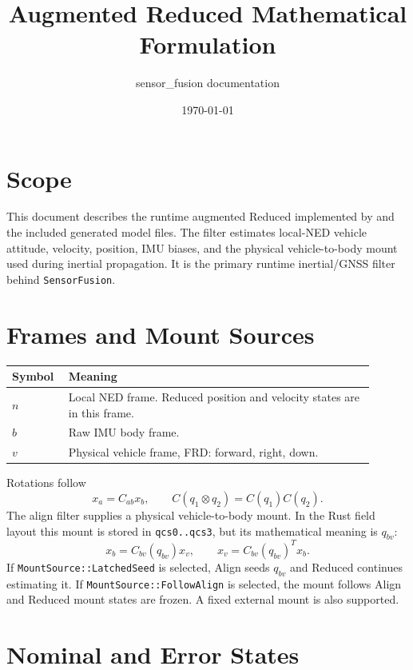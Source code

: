 \documentclass[11pt]{article}
\title{Augmented Reduced Mathematical Formulation}
\author{sensor\_fusion documentation}
\date{\today}
\newcommand{\T}{^{T}}
\begin{document}
\maketitle
\tableofcontents
\newpage

\section{Scope}

This document describes the runtime augmented Reduced implemented by
 and the included generated model files. The
filter estimates local-NED vehicle attitude, velocity, position, IMU biases, and
the physical vehicle-to-body mount used during inertial propagation.
It is the primary runtime inertial/GNSS filter behind \texttt{SensorFusion}.

\section{Frames and Mount Sources}

\begin{longtable}{>{\raggedright\arraybackslash}p{0.12\linewidth} >{\raggedright\arraybackslash}p{0.78\linewidth}}
\toprule
\textbf{Symbol} & \textbf{Meaning} \\
\midrule
\(n\) & Local NED frame. Reduced position and velocity states are in this frame. \\
\(b\) & Raw IMU body frame. \\
\(v\) & Physical vehicle frame, FRD: forward, right, down. \\
\bottomrule
\end{longtable}

Rotations follow
\begin{equation}
  x_a=C_{ab}x_b,\qquad C(q_1\otimes q_2)=C(q_1)C(q_2).
\end{equation}
The align filter supplies a physical vehicle-to-body mount. In the Rust field
layout this mount is stored in \texttt{qcs0..qcs3}, but its mathematical meaning
is \(q_{bv}\):
\begin{equation}
  x_b=C_{bv}(q_{bv})x_v,\qquad x_v=C_{bv}(q_{bv})\T x_b .
\end{equation}
If \texttt{MountSource::LatchedSeed} is selected, Align seeds \(q_{bv}\) and
Reduced continues estimating it. If \texttt{MountSource::FollowAlign} is
selected, the mount follows Align and Reduced mount states are frozen. A fixed
external mount is also supported.

\section{Nominal and Error States}
\end{document}
